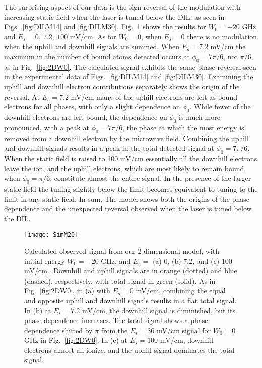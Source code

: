 \documentclass[aps,pra,reprint,groupedaddress]{revtex4-1}
\begin{document}
The surprising aspect of our data is the sign reversal of the modulation with increasing static field when the laser is tuned below the DIL, as seen in Figs.~\ref{fig:DILM14} and \ref{fig:DILM30}. Fig.~\ref{fig:2DW20} shows the results for $W_0 = -20$ GHz and $E_s = 0, ~7.2, ~100$ mV/cm. As for $W_0=0$, when $E_s=0$ there is no modulation when the uphill and downhill signals are summed. When $E_s= 7.2$ mV/cm the maximum in the number of bound atoms detected occurs at $\phi_0 = 7\pi/6$, not $\pi/6$, as in Fig.~\ref{fig:2DW0}. The calculated signal exhibits the same phase reversal seen in the experimental data of Figs.~\ref{fig:DILM14} and \ref{fig:DILM30}. Examining the uphill and downhill electron contributions separately shows the origin of the reversal. At $E_s = 7.2$ mV/cm many of the uphill electrons are left as bound electrons for all phases, with only a slight dependence on $\phi_0$. While fewer of the downhill electrons are left bound, the dependence on $\phi_0$ is much more pronounced, with a peak at $\phi_0=7\pi/6$, the phase at which the most energy is removed from a downhill electron by the microwave field. Combining the uphill and downhill signals results in a peak in the total detected signal at $\phi_0=7\pi/6$. When the static field is raised to 100 mV/cm essentially all the downhill electrons leave the ion, and the uphill electrons, which are most likely to remain bound when $\phi_0=\pi/6$, constitute almost the entire signal. In the presence of the larger static field the tuning slightly below the limit becomes equivalent to tuning to the limit in any static field. In sum, The model shows both the origins of the phase dependence and the unexpected reversal observed when the laser is tuned below the DIL.

\begin{figure}
	\texttt{[image: SimM20]}
	\caption{Calculated observed signal from our 2 dimensional model, with initial energy $W_0 = -20$ GHz, and $E_s =$ (a) 0, (b) 7.2, and (c) 100 mV/cm.. Downhill and uphill signals are in orange (dotted) and blue (dashed), respectively, with total signal in green (solid). As in Fig.~\ref{fig:2DW0}, in (a) with $E_s = 0$ mV/cm, combining the equal and opposite uphill and downhill signals results in a flat total signal. In (b) at $E_s = 7.2$ mV/cm, the downhill signal is diminished, but its phase dependence increases. The total signal shows a phase dependence shifted by $\pi$ from the $E_s=36$ mV/cm signal for $W_0 = 0$ GHz in Fig.~\ref{fig:2DW0}. In (c) at $E_s = 100$ mV/cm, downhill electrons almost all ionize, and the uphill signal dominates the total signal.}
	\label{fig:2DW20}
\end{figure}
\end{document}
